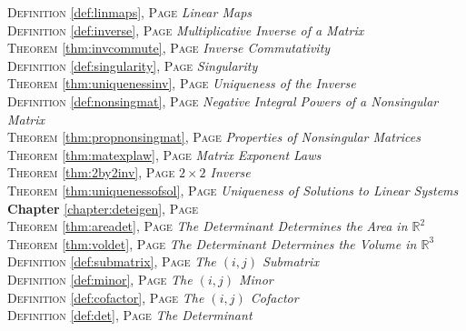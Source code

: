 \begin{multicols}{2}
{\textsc{Definition} \ref{def:linmaps}, \textsc{Page} \pageref{def:linmaps} \textit{Linear Maps} \\
\textsc{Definition} \ref{def:inverse}, \textsc{Page} \pageref{def:inverse} \textit{Multiplicative Inverse of a Matrix} \\
\textsc{Theorem} \ref{thm:invcommute}, \textsc{Page} \pageref{thm:invcommute} \textit{Inverse Commutativity} \\
\textsc{Definition} \ref{def:singularity}, \textsc{Page} \pageref{def:singularity} \textit{Singularity} \\
\textsc{Theorem} \ref{thm:uniquenessinv}, \textsc{Page} \pageref{thm:uniquenessinv} \textit{Uniqueness of the Inverse} \\
\textsc{Definition} \ref{def:nonsingmat}, \textsc{Page} \pageref{def:nonsingmat} \textit{Negative Integral Powers of a Nonsingular Matrix} \\
\textsc{Theorem} \ref{thm:propnonsingmat}, \textsc{Page} \pageref{thm:propnonsingmat} \textit{Properties of Nonsingular Matrices} \\
\textsc{Theorem} \ref{thm:matexplaw}, \textsc{Page} \pageref{thm:matexplaw} \textit{Matrix Exponent Laws} \\
\textsc{Theorem} \ref{thm:2by2inv}, \textsc{Page} \pageref{thm:2by2inv} \textit{\(2\times 2\) Inverse} \\
\textsc{Theorem} \ref{thm:uniquenessofsol}, \textsc{Page} \pageref{thm:uniquenessofsol} \textit{Uniqueness of Solutions to Linear Systems} \\
\textbf{Chapter} \ref{chapter:deteigen}, \textsc{Page} \pageref{chapter:deteigen} \\
\textsc{Theorem} \ref{thm:areadet}, \textsc{Page} \pageref{thm:areadet} \textit{The Determinant Determines the Area in \(\mathbb {R}^2\)} \\
\textsc{Theorem} \ref{thm:voldet}, \textsc{Page} \pageref{thm:voldet} \textit{The Determinant Determines the Volume in \(\mathbb {R}^3\)} \\
\textsc{Definition} \ref{def:submatrix}, \textsc{Page} \pageref{def:submatrix} \textit{The \((i,j)\) Submatrix} \\
\textsc{Definition} \ref{def:minor}, \textsc{Page} \pageref{def:minor} \textit{The \((i,j)\) Minor} \\
\textsc{Definition} \ref{def:cofactor}, \textsc{Page} \pageref{def:cofactor} \textit{The \((i,j)\) Cofactor} \\
\textsc{Definition} \ref{def:det}, \textsc{Page} \pageref{def:det} \textit{The Determinant} \\
}
\end{multicols}
